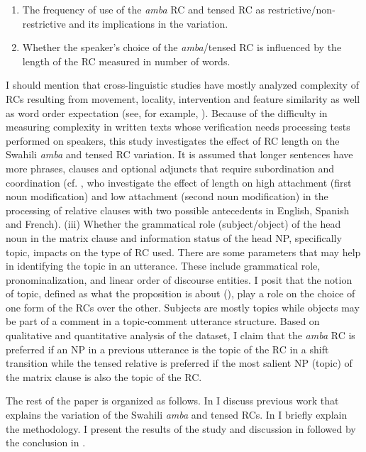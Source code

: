 \documentclass[output=paper,colorlinks,citecolor=brown]{langscibook}
\begin{document}
\begin{enumerate}
        \item The frequency of use of the \textit{amba} RC and tensed RC as restrictive/non-restrictive and its implications in the variation.
        \item Whether the speaker’s choice of the \textit{amba}\slash tensed RC is influenced by the length of the RC measured in number of words.
\end{enumerate}
I should mention that cross-linguistic studies have mostly analyzed complexity of RCs resulting from movement, locality, intervention and feature similarity as well as word order expectation (see, for example, \citealt{DurrlemanEtAl2016, Rizzi2013Locality, LevyEtAl2013}). Because of the difficulty in measuring complexity in written texts whose verification needs processing tests performed on speakers, this study investigates the effect of RC length on the Swahili \textit{amba} and tensed RC variation. It is assumed that longer sentences have more phrases, clauses and optional adjuncts that require subordination and coordination (cf. \citealt{HemforthEtAl2015}, who investigate the effect of length on high attachment (first noun modification) and low attachment (second noun modification) in the processing of relative clauses with two possible antecedents in English, Spanish and French). (iii) Whether the grammatical role (subject/object) of the head noun in the matrix clause and information status of the head NP, specifically topic, impacts on the type of RC used. There are some parameters that may help in identifying the topic in an utterance. These include grammatical role, pronominalization, and linear order of discourse entities. I posit that the notion of topic, defined as what the proposition is about (\citealt{Gundel1985, Lambrecht1994}), play a role on the choice of one form of the RCs over the other. Subjects are mostly topics while objects may be part of a comment in a topic-comment utterance structure. Based on qualitative and quantitative analysis of the dataset, I claim that the \textit{amba} RC is preferred if an NP in a previous utterance is the topic of the RC in a shift transition while the tensed relative is preferred if the most salient NP (topic) of the matrix clause is also the topic of the RC.

The rest of the paper is organized as follows. In  I discuss previous work that explains the variation of the Swahili \textit{amba} and tensed RCs. In  I briefly explain the methodology. I present the results of the study and discussion in  followed by the conclusion in .
\end{document}
